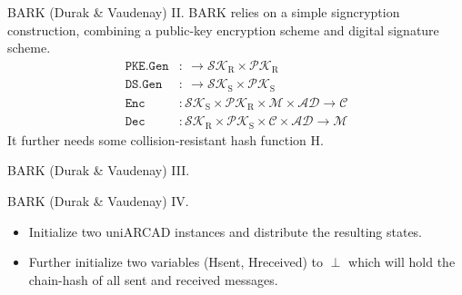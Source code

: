 \documentclass{beamer}
\renewcommand{\t}{\text}
\begin{document}
\begin{frame}{BARK (Durak \& Vaudenay) II.}
  BARK relies on a simple signcryption construction, combining a public-key
  encryption scheme and digital signature scheme.
  \begin{align*}
    \texttt{PKE.Gen} & : \ \rightarrow \mathcal{SK}_\t{R} \times \mathcal{PK}_\t{R} \\
    \texttt{DS.Gen} & : \ \rightarrow \mathcal{SK}_\t{S} \times \mathcal{PK}_\t{S} \\
    \texttt{Enc} & : \mathcal{SK}_\t{S} \times \mathcal{PK}_\t{R} \times \mathcal{M} \times
                   \mathcal{AD} \rightarrow \mathcal{C} \\
    \texttt{Dec} & : \mathcal{SK}_\t{R} \times \mathcal{PK}_\t{S} \times
  \mathcal{C} \times \mathcal{AD} \rightarrow \mathcal{M}
  \end{align*}
  It further needs some collision-resistant hash function H.
\end{frame}

\begin{frame}{BARK (Durak \& Vaudenay) III.}
   \begin{figure}[h]
     \centering
     \setlength{\fboxsep}{10pt}
     \scalebox{0.7}{%
       \fbox{%
          
       }
     }
  \end{figure}
\end{frame}

\begin{frame}{BARK (Durak \& Vaudenay) IV.}
   \scriptsize
  \begin{minipage}[h]{0.49\textwidth}
      \begin{figure}[ht]
        \centering
        \setlength{\fboxsep}{10pt}
        \scalebox{0.7}{%
        \fbox{%
          
        }
      }
    \end{figure}
    \end{minipage}
  \begin{minipage}[h]{0.49\textwidth}
      \begin{itemize}
      \item Initialize two uniARCAD instances and distribute the
        resulting states.
      \item Further initialize two variables (Hsent, Hreceived) to $\perp$ which will
        hold the chain-hash of all sent and received messages.
      \end{itemize}
    \end{minipage}
  \end{frame}
\end{document}
